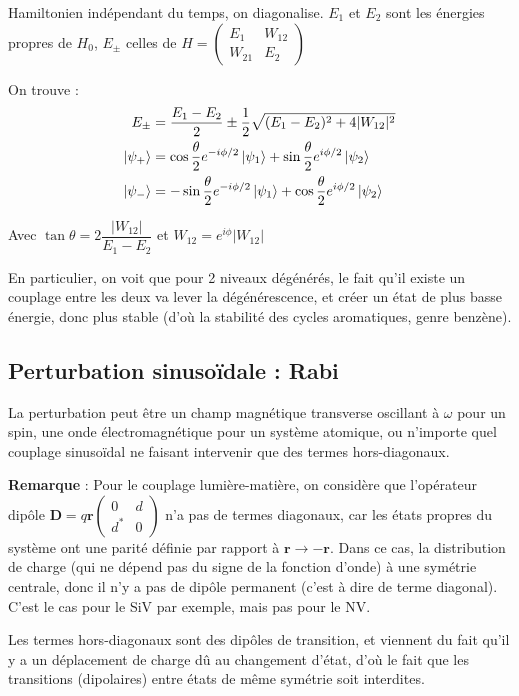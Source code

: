 \documentclass[a4paper]{report}
\begin{document}
   Hamiltonien indépendant du temps, on diagonalise. $E_1$ et $E_2$ sont les énergies propres de $H_0$, $E_\pm$ celles de  $H= \begin{pmatrix} E_1 & W_{12} \\ W_{21} & E_2  \end{pmatrix}$
   
   On trouve : \begin{align}  
   E_\pm &= \dfrac{E_1-E_2}{2}\pm\dfrac{1}{2}\sqrt{(E_1-E_2)^2+4|W_{12}|^2} \\   
   \ket{\psi_+} &= \cos \dfrac{\theta}{2} e^{-i\phi/2} \ket{\psi_1}+\sin \dfrac{\theta}{2} e^{i\phi/2} \ket{\psi_2} \\   
   \ket{\psi_-}&= -\sin \dfrac{\theta}{2} e^{-i\phi/2} \ket{\psi_1}+\cos \dfrac{\theta}{2} e^{i\phi/2} \ket{\psi_2} 
  \end{align}
   
   Avec $\tan \theta = 2 \dfrac{|W_{12}|}{E_1-E_2}$ et $W_{12}=e^{i\phi}|W_{12}|$
   
   En particulier, on voit que pour 2 niveaux dégénérés, le fait qu'il existe un couplage entre les deux va lever la dégénérescence, et créer un état de plus basse énergie, donc plus stable (d'où la stabilité des cycles aromatiques, genre benzène).
   
   \subsection{Perturbation sinusoïdale : Rabi}
   La perturbation peut être un champ magnétique transverse oscillant à $\omega$ pour un spin, une onde électromagnétique pour un système atomique, ou n'importe quel couplage sinusoïdal ne faisant intervenir que des termes hors-diagonaux.
   
   
   \begin{tcolorbox}
   \textbf{Remarque} : Pour le couplage lumière-matière, on considère que l'opérateur dipôle $\textbf{D}=q\textbf{r}\begin{pmatrix}
   0 & d \\ d^* & 0
   \end{pmatrix}$ n'a pas de termes diagonaux, car les états propres du système ont une parité définie par rapport à $\textbf{r} \to -\textbf{r}$. Dans ce cas, la distribution de charge (qui ne dépend pas du signe de la fonction d'onde) à une symétrie centrale, donc il n'y a pas de dipôle permanent (c'est à dire de terme diagonal). C'est le cas pour le SiV par exemple, mais pas pour le NV.
   
   Les termes hors-diagonaux sont des dipôles de transition, et viennent du fait qu'il y a un déplacement de charge dû au changement d'état, d'où le fait que les transitions (dipolaires) entre états de même symétrie soit interdites.
   \end{tcolorbox}
   
\end{document}
